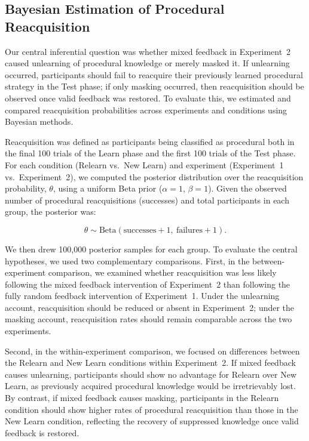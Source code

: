\documentclass{article}
\begin{document}
\subsection{Bayesian Estimation of Procedural Reacquisition}
Our central inferential question was whether mixed feedback
in Experiment~2 caused unlearning of procedural knowledge or
merely masked it. If unlearning occurred, participants should
fail to reacquire their previously learned procedural
strategy in the Test phase; if only masking occurred, then
reacquisition should be observed once valid feedback was
restored. To evaluate this, we estimated and compared
reacquisition probabilities across experiments and
conditions using Bayesian methods.

Reacquisition was defined as participants being classified
as procedural both in the final 100 trials of the Learn
phase and the first 100 trials of the Test phase. For each
condition (Relearn vs.\ New Learn) and experiment
(Experiment~1 vs.\ Experiment~2), we computed the posterior
distribution over the reacquisition probability, $\theta$,
using a uniform Beta prior ($\alpha = 1$, $\beta = 1$). Given
the observed number of procedural reacquisitions (successes)
and total participants in each group, the posterior was:

\begin{equation}
\theta \sim \mathrm{Beta}(\text{successes} + 1,\ \text{failures} + 1).
\end{equation}

We then drew 100{,}000 posterior samples for each group. To
evaluate the central hypotheses, we used two complementary
comparisons. First, in the between-experiment comparison, we
examined whether reacquisition was less likely following the
mixed feedback intervention of Experiment~2 than following
the fully random feedback intervention of Experiment~1.
Under the unlearning account, reacquisition should be
reduced or absent in Experiment~2; under the masking
account, reacquisition rates should remain comparable across
the two experiments.  

Second, in the within-experiment comparison, we focused on
differences between the Relearn and New Learn conditions
within Experiment~2. If mixed feedback causes unlearning,
participants should show no advantage for Relearn over New
Learn, as previously acquired procedural knowledge would be
irretrievably lost. By contrast, if mixed feedback causes
masking, participants in the Relearn condition should show
higher rates of procedural reacquisition than those in the
New Learn condition, reflecting the recovery of suppressed
knowledge once valid feedback is restored.  
\end{document}
